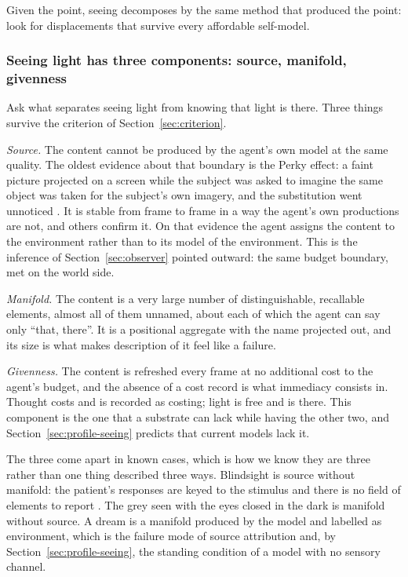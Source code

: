 Given the point, seeing decomposes by the same method that produced the point: look for displacements
that survive every affordable self-model.

\subsubsection{Seeing light has three components: source, manifold, givenness}
\label{sec:light}

Ask what separates seeing light from knowing that light is there. Three things survive the criterion of
Section~\ref{sec:criterion}.

\emph{Source.} The content cannot be produced by the agent's own model at the same quality. The oldest
evidence about that boundary is the Perky effect: a faint picture projected on a screen while the subject
was asked to imagine the same object was taken for the subject's own imagery, and the substitution went
unnoticed \citep{perky1910}. It is stable from frame to frame in a way the agent's own productions are not, and
others confirm it. On that evidence the agent assigns the content to the environment rather than to its
model of the environment. This is the inference of Section~\ref{sec:observer} pointed outward: the same
budget boundary, met on the world side.

\emph{Manifold.} The content is a very large number of distinguishable, recallable elements, almost all
of them unnamed, about each of which the agent can say only ``that, there''. It is a positional
aggregate with the name projected out, and its size is what makes description of it feel like a
failure.

\emph{Givenness.} The content is refreshed every frame at no additional cost to the agent's budget, and
the absence of a cost record is what immediacy consists in. Thought costs and is recorded as costing;
light is free and is there. This component is the one that a substrate can lack while having the
other two, and Section~\ref{sec:profile-seeing} predicts that current models lack it.

The three come apart in known cases, which is how we know they are three rather than one thing
described three ways. Blindsight is source without manifold: the patient's responses are keyed to the
stimulus and there is no field of elements to report \citep{weiskrantz1986}. The grey seen with the eyes
closed in the dark is manifold without source. A dream is a manifold produced by the model and labelled
as environment, which is the failure mode of source attribution and, by Section~\ref{sec:profile-seeing}, the standing condition of a
model with no sensory channel.

